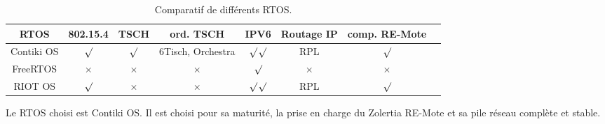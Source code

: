 \begin{table}[H]
    \begin{adjustbox}{width=\textwidth}
        \begin{tabular}{c||c|c|c|c|c|c|c}
            RTOS       & 802.15.4 &   TSCH   &     ord. TSCH     &       IPV6     & Routage IP & comp. RE-Mote\\ \hline
            
            Contiki OS & $\surd$  & $\surd$  & 6Tisch, Orchestra & $\surd$$\surd$ &     RPL    & $\surd$ \\ \hline
            
            FreeRTOS   & $\times$ & $\times$ &      $\times$     &     $\surd$    &  $\times$  & $\times$\\ \hline
            RIOT OS    & $\surd$  & $\times$ &      $\times$     & $\surd$$\surd$ &     RPL    &$\surd$ \\
        \end{tabular}
    \end{adjustbox}
    \caption{Comparatif de différents RTOS.}
    \label{tb:state-rtos-choice}
\end{table}
Le RTOS choisi est Contiki OS. Il est choisi pour sa maturité, la prise en charge du Zolertia RE-Mote et sa pile réseau complète et stable.

